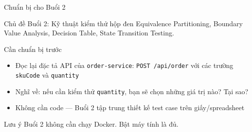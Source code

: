 \documentclass[aspectratio=169,12pt]{beamer}
\begin{document}
\begin{frame}[shrink=10]{Chuẩn bị cho Buổi 2}
  \begin{block}{Chủ đề Buổi 2: Kỹ thuật kiểm thử hộp đen}
    Equivalence Partitioning, Boundary Value Analysis, Decision Table,
    State Transition Testing.
  \end{block}

  \vspace{0.2em}
  \begin{block}{Cần chuẩn bị trước}
    \begin{itemize}
      \item Đọc lại đặc tả API của \texttt{order-service}:
        \texttt{POST /api/order} với các trường \texttt{skuCode} và \texttt{quantity}
      \item Nghĩ về: nếu cần kiểm thử \texttt{quantity}, bạn sẽ chọn những giá trị nào? Tại sao?
      \item Không cần code --- Buổi 2 tập trung thiết kế test case trên giấy/spreadsheet
    \end{itemize}
  \end{block}

  \vspace{-0.2em}
  \begin{alertblock}{Lưu ý}
    Buổi 2 không cần chạy Docker. Bật máy tính là đủ.
  \end{alertblock}
\end{frame}
\end{document}
